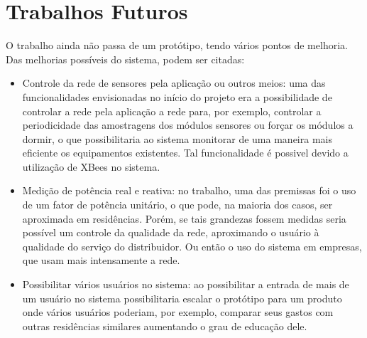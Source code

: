 \chapter{Trabalhos Futuros}

O trabalho ainda não passa de um protótipo, tendo vários pontos de melhoria. Das melhorias possíveis do sistema, podem ser citadas:

\begin{itemize}
  \item{Controle da rede de sensores pela aplicação ou outros meios:} uma das funcionalidades envisionadas no início do projeto era a possibilidade de controlar a rede pela aplicação a rede para, por exemplo, controlar a periodicidade das amostragens dos módulos sensores ou forçar os módulos a dormir, o que possibilitaria ao sistema monitorar de uma maneira mais eficiente os equipamentos existentes. Tal funcionalidade é possivel devido a utilização de XBees no sistema.

  \item{Medição de potência real e reativa:} no trabalho, uma das premissas foi o uso de um fator de potência unitário, o que pode, na maioria dos casos, ser aproximada em residências. Porém, se tais grandezas fossem medidas seria possível um controle da qualidade da rede, aproximando o usuário à qualidade do serviço do distribuidor. Ou então o uso do sistema em empresas, que usam mais intensamente a rede.

  \item{Possibilitar vários usuários no sistema:} ao possibilitar a entrada de mais de um usuário no sistema possibilitaria escalar o protótipo para um produto onde vários usuários poderiam, por exemplo, comparar seus gastos com outras residências similares aumentando o grau de educação dele.
\end{itemize}